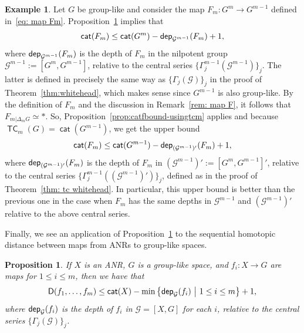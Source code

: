 \documentclass[amscd,amssymb,verbatim,10pt]{amsart}
\numberwithin{equation}{section}
\theoremstyle{plain}
\newtheorem{proposition}[theorem]{Proposition}
\theoremstyle{definition}
\newtheorem{ex}[theorem]{Example}
\DeclareMathOperator{\cat}{{\mathsf{cat}}}
\DeclareMathOperator{\TC}{{\mathsf{TC}}}
\newcommand{\cG}{{\mathcal{G}}}
\newcommand{\D}{{\sf {D}}}
\newcommand{\dep}{{\sf {dep}}}
\begin{document}
\begin{ex}\label{ex: depth of Fm}
    Let $G$ be group-like and consider the map $F_m\colon G^m\to G^{m-1}$ defined in~\eqref{eq: map Fm}. Proposition~\ref{prop:catfbound} implies that
    \[
    \cat(F_m)\le\cat(G^m)-\dep_{\cG^{m-1}}(F_m)+1,
    \]
    where $\dep_{\cG^{m-1}}(F_m)$ is the depth of $F_m$ in the nilpotent group $\cG^{m-1}:=[G^m,G^{m-1}]$, relative to the central series $\{\Gamma_j^{m-1}(\cG^{m-1})\}_j$. The latter is defined in precisely the same way as $\{\Gamma_j(\cG)\}_j$ in the proof of Theorem~\ref{thm:whitehead}, which makes sense since $G^{m-1}$ is also group-like. By the definition of $F_m$ and the discussion in Remark~\ref{rem: map F}, it follows that $F_{m|\Delta_mG}\simeq \ast$. So, Proposition~\ref{prop:catfbound-usingtcm} applies and because $\TC_m(G)=\cat(G^{m-1})$, we get the upper bound
    \[
    \cat(F_m)\le\cat(G^{m-1})-\dep_{(\cG^{m-1})'}(F_m)+1,
    \]
    where $\dep_{(\cG^{m-1})'}(F_m)$ is the depth of $F_m$ in $(\cG^{m-1})':=[G^m,G^{m-1}]'$, relative to the central series $\{\Gamma_j^{m-1}((\cG^{m-1})')\}_j$, defined as in the proof of Theorem~\ref{thm: tc whitehead}. In particular, this upper bound is better than the previous one in the case when $F_m$ has the same depths in $\cG^{m-1}$ and $(\cG^{m-1})'$ relative to the above central series.
\end{ex}

Finally, we see an application of Proposition~\ref{prop:catfbound} to the sequential homotopic distance between maps from ANRs to group-like spaces.


\begin{proposition}\label{prop:catfbound}
    If $X$ is an ANR, $G$ is a group-like space, and $f_i\colon X\to G$ are maps for $1\le i \le m$, then we have that
    \[
    \D(f_1,\dots,f_m)\le\cat(X)-\min\left\{\dep_{\cG}(f_i)\ \middle|\ 1\le i \le m\right\}
    +1,
    \]
    where $\dep_{\cG}(f_i)$ is the depth of $f_i$ in $\cG=[X,G]$ for each $i$, relative to the central series $\{\Gamma_j(\cG)\}_j$.
\end{proposition}
\end{document}
